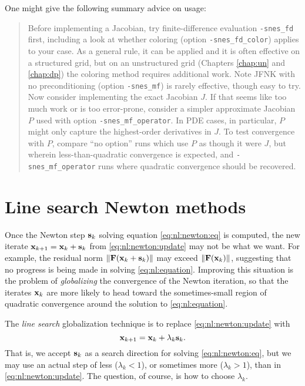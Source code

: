 One might give the following summary advice on \pSNES usage:

\begin{quote}
Before implementing a Jacobian, try finite-difference evaluation \texttt{-snes\_fd} first, including a look at whether coloring (option \texttt{-snes\_fd\_color}) applies to your case.  As a general rule, it can be applied and it is often effective on a structured grid, but on an unstructured grid (Chapters \ref{chap:un} and \ref{chap:dp}) the coloring method requires additional work.  Note JFNK with no preconditioning (option \texttt{-snes\_mf}) is rarely effective, though easy to try.  Now consider implementing the exact Jacobian $J$.  If that seems like too much work or is too error-prone, consider a simpler approximate Jacobian $P$ used with option \texttt{-snes\_mf\_operator}.  In PDE cases, in particular, $P$ might only capture the highest-order derivatives in $J$.  To test convergence with $P$, compare ``no option'' runs which use $P$ as though it were $J$, but wherein less-than-quadratic convergence is expected, and \texttt{-snes\_mf\_operator} runs where quadratic convergence should be recovered.
\end{quote}


\section{Line search Newton methods} \label{sec:linesearch}

Once the Newton step $\mathbf{s}_k$ solving equation \eqref{eq:nl:newton:eq} is computed, the new iterate $\mathbf{x}_{k+1} = \mathbf{x}_k + \mathbf{s}_k$ from \eqref{eq:nl:newton:update} may not be what we want.  For example, the residual norm $\|\mathbf{F}(\mathbf{x}_k + \mathbf{s}_k)\|$ may exceed $\|\mathbf{F}(\mathbf{x}_{k})\|$, suggesting that no progress is being made in solving \eqref{eq:nl:equation}.  Improving this situation is the problem of \emph{globalizing} the convergence of the Newton iteration, so that the iterates $\mathbf{x}_k$ are more likely to head toward the sometimes-small region of quadratic convergence around the solution to \eqref{eq:nl:equation}.

The \emph{line search} globalization technique \citep{DennisSchnabel1983} is to replace \eqref{eq:nl:newton:update} with
\begin{equation}
\mathbf{x}_{k+1} = \mathbf{x}_k + \lambda_k \mathbf{s}_k.  \label{eq:nl:linesearchupdate}
\end{equation}
That is, we accept $\mathbf{s}_k$ as a search direction for solving \eqref{eq:nl:newton:eq}, but we may use an actual step of less ($\lambda_k < 1$), or sometimes more ($\lambda_k > 1$), than in \eqref{eq:nl:newton:update}.  The question, of course, is how to choose $\lambda_k$.


